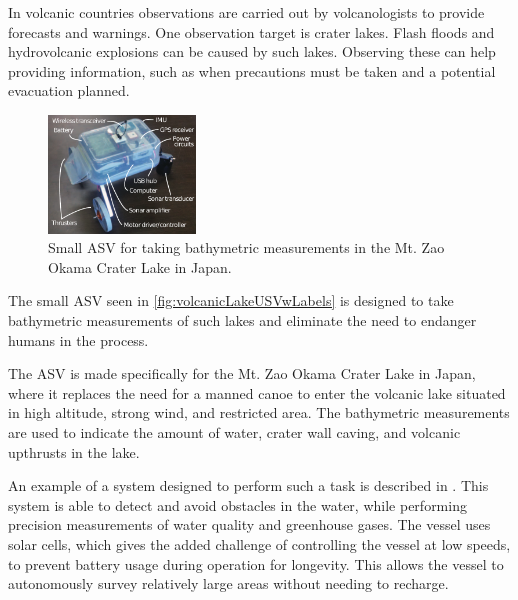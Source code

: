 In volcanic countries observations are carried out by volcanologists to provide forecasts and warnings. One observation target is crater lakes. Flash floods and hydrovolcanic explosions can be caused by such lakes. Observing these can help providing information, such as when precautions must be taken and a potential evacuation planned. \cite{AWatanabe}
%
\begin{figure}[H]
  \includegraphics[width=0.35\textwidth]{figures/volcanicLakeUSVwLabels.pdf}
  \caption{Small ASV for taking bathymetric measurements in the Mt. Zao Okama Crater Lake in Japan. \cite{AWatanabe}}
  \label{fig:volcanicLakeUSVwLabels}
\end{figure}
%
The small ASV seen in \autoref{fig:volcanicLakeUSVwLabels} is designed to take bathymetric measurements of such lakes and eliminate the need to endanger humans in the process. \cite{AWatanabe}

The ASV is made specifically for the Mt. Zao Okama Crater Lake in Japan, where it replaces the need for a manned canoe to enter the volcanic lake situated in high altitude, strong wind, and restricted area. The bathymetric measurements are used to indicate the amount of water, crater wall caving, and volcanic upthrusts in the lake. \cite{AWatanabe}

An example of a system designed to perform such a task is described in \cite{asv_solar}.
This system is able to detect and avoid obstacles in the water, while performing precision measurements of water quality and greenhouse gases. 
The vessel uses solar cells, which gives the added challenge of controlling the vessel at low speeds, to prevent battery usage during operation for longevity. 
This allows the vessel to autonomously survey relatively large areas without needing to recharge. 

